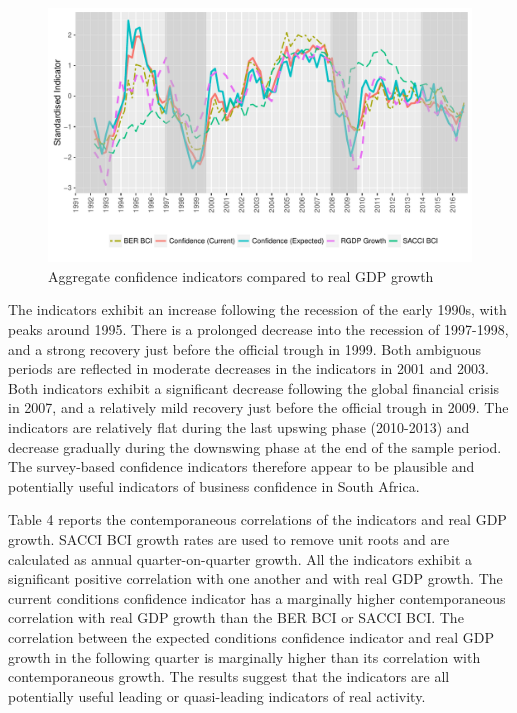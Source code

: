 \documentclass[11pt,]{article}
\begin{document}
\begin{figure}
\centering
\includegraphics{BCon_5_Journal_files/figure-latex/figure2-1.pdf}
\caption{Aggregate confidence indicators compared to real GDP growth}
\end{figure}

The indicators exhibit an increase following the recession of the early
1990s, with peaks around 1995. There is a prolonged decrease into the
recession of 1997-1998, and a strong recovery just before the official
trough in 1999. Both ambiguous periods are reflected in moderate
decreases in the indicators in 2001 and 2003. Both indicators exhibit a
significant decrease following the global financial crisis in 2007, and
a relatively mild recovery just before the official trough in 2009. The
indicators are relatively flat during the last upswing phase (2010-2013)
and decrease gradually during the downswing phase at the end of the
sample period. The survey-based confidence indicators therefore appear
to be plausible and potentially useful indicators of business confidence
in South Africa.

Table 4 reports the contemporaneous correlations of the indicators and
real GDP growth. SACCI BCI growth rates are used to remove unit roots
and are calculated as annual quarter-on-quarter growth. All the
indicators exhibit a significant positive correlation with one another
and with real GDP growth. The current conditions confidence indicator
has a marginally higher contemporaneous correlation with real GDP growth
than the BER BCI or SACCI BCI. The correlation between the expected
conditions confidence indicator and real GDP growth in the following
quarter is marginally higher than its correlation with contemporaneous
growth. The results suggest that the indicators are all potentially
useful leading or quasi-leading indicators of real activity.
\end{document}
